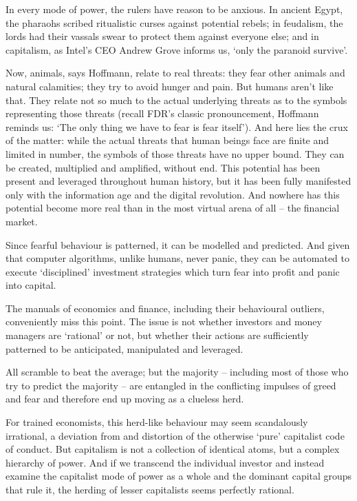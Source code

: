 \documentclass[
]{book}
\begin{document}
In every mode of power, the rulers have reason to be anxious. In ancient Egypt, the pharaohs
scribed ritualistic curses against potential rebels; in feudalism, the lords had their vassals
swear to protect them against everyone else; and in capitalism, as Intel's CEO Andrew Grove
informs us, `only the paranoid survive'.

Now, animals, says Hoffmann, relate to real threats: they fear other animals and natural
calamities; they try to avoid hunger and pain. But humans aren't like that. They relate not so
much to the actual underlying threats as to the symbols representing those threats (recall
FDR's classic pronouncement, Hoffmann reminds us: `The only thing we have to fear is fear
itself'). And here lies the crux of the matter: while the actual threats that human beings face
are finite and limited in number, the symbols of those threats have no upper bound. They can
be created, multiplied and amplified, without end. This potential has been present and
leveraged throughout human history, but it has been fully manifested only with the information
age and the digital revolution. And nowhere has this potential become more real than in the
most virtual arena of all -- the financial market.

Since fearful behaviour is
patterned, it can be modelled and predicted. And given that computer algorithms, unlike
humans, never panic, they can be automated to execute `disciplined' investment strategies
which turn fear into profit and panic into capital.

The manuals of economics and finance, including their behavioural outliers, conveniently miss
this point. The issue is not whether investors and money managers are `rational' or not, but
whether their actions are sufficiently patterned to be anticipated, manipulated and leveraged.

All scramble to beat the
average; but the majority -- including most of those who try to predict the majority -- are
entangled in the conflicting impulses of greed and fear and therefore end up moving as a
clueless herd.

For trained economists, this herd-like behaviour may seem scandalously
irrational, a deviation from and distortion of the otherwise `pure' capitalist code of conduct. But
capitalism is not a collection of identical atoms, but a complex hierarchy of power. And if we
transcend the individual investor and instead examine the capitalist mode of power as a
whole and the dominant capital groups that rule it, the herding of lesser capitalists seems
perfectly rational.
\end{document}
